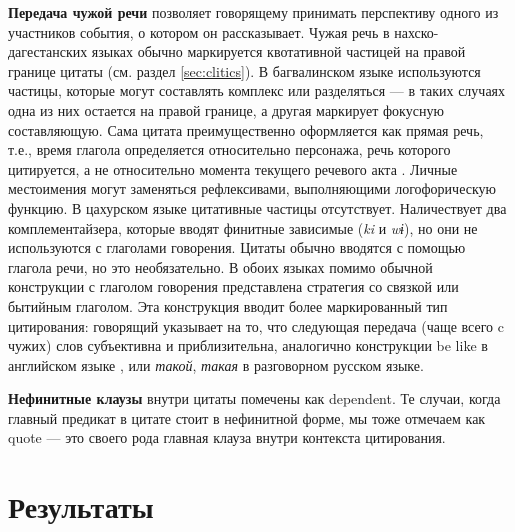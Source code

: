 \textbf{Передача чужой речи} позволяет говорящему принимать перспективу одного из участников события, о котором он рассказывает. Чужая речь в нахско-дагестанских языках обычно маркируется квотативной частицей на правой границе цитаты (см. раздел \ref{sec:clitics}). В багвалинском языке используются частицы, которые могут составлять комплекс или разделяться --- в таких случаях одна из них остается на правой границе, а другая маркирует фокусную составляющую. Сама цитата преимущественно оформляется как прямая речь, т.е., время глагола определяется относительно персонажа, речь которого цитируется, а не относительно момента текущего речевого акта \citep{evans2018}. Личные местоимения могут заменяться рефлексивами, выполняющими логофорическую функцию. В цахурском языке цитативные частицы отсутствует. Наличествует два комплементайзера, которые вводят финитные зависимые (\textit{ki} и \textit{wɨ}), но они не используются с глаголами говорения. Цитаты обычно вводятся с помощью глагола речи, но это необязательно. В обоих языках помимо обычной конструкции с глаголом говорения представлена стратегия со связкой или бытийным глаголом. Эта конструкция вводит более маркированный тип цитирования: говорящий указывает на то, что следующая передача (чаще всего c чужих) слов субъективна и приблизительна, аналогично конструкции be like в английском языке \citep{romainelange1991}, или \textit{такой}, \textit{такая} в разговорном русском языке.


\textbf{Нефинитные клаузы} внутри цитаты помечены как dependent. Те случаи, когда главный предикат в цитате стоит в нефинитной форме, мы тоже отмечаем как quote --- это своего рода главная клауза внутри контекста цитирования.

\vfill
\pagebreak

\section{Результаты} \label{sec:results}

